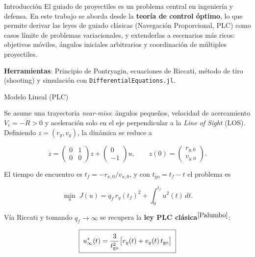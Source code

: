 \begin{block}{Introducción}
	El guiado de proyectiles es un problema central en ingeniería y defensa. 
	En este trabajo se aborda desde la \textbf{teoría de control óptimo}, 
	lo que permite derivar las leyes de guiado clásicas (Navegación Proporcional, 
	PLC) como casos límite de problemas variacionales, y extenderlas a escenarios 
	más ricos: objetivos móviles, ángulos iniciales arbitrarios y coordinación 
	de múltiples proyectiles.

	\vspace{0.2cm}
	\textbf{Herramientas}: Principio de Pontryagin, ecuaciones de Riccati, 
	método de tiro (shooting) y simulación con \texttt{DifferentialEquations.jl}.

\end{block}

\begin{block}{Modelo Lineal (PLC)}
	\begin{exampleblock}{}
	Se asume una trayectoria \textit{near-miss}: ángulos pequeños, velocidad de 
	acercamiento $V_c=-\dot R>0$ y aceleración solo en el eje perpendicular a la 
	\textit{Line of Sight} (LOS). Definiendo $z=(r_y,v_y)$, la dinámica se reduce a
	
	$$
	\dot z=\begin{pmatrix}0&1\\0&0\end{pmatrix}z
	+\begin{pmatrix}0\\-1\end{pmatrix}u,
	\qquad z(0)=\begin{pmatrix}r_{y,0}\\v_{y,0}\end{pmatrix}.
	$$
	
	El tiempo de encuentro es $t_f=-r_{x,0}/v_{x,0}$, y con 
	$t_{\mathrm{go}}=t_f-t$ el problema es
	
	$$
	\min_{u}\; J(u)=q_f\,r_y(t_f)^2+\int_0^{t_f}u^2(t)\,dt.
	$$
	
	Vía Riccati y tomando $q_f\to\infty$ se recupera la \textbf{ley PLC clásica}$^{\cite{Palumbo}}$:
	
	$$
	\boxed{\;\vphantom{\frac{\frac{A}{B}}{\frac{C}{D}}}
	u_\infty^*(t)=\frac{3}{t_{\mathrm{go}}^2}
	\big[r_y(t)+v_y(t)\,t_{\mathrm{go}}\big]\;}
	$$
	\end{exampleblock}
	{\def\marginimagetop{-2}
	}

	
\end{block}

